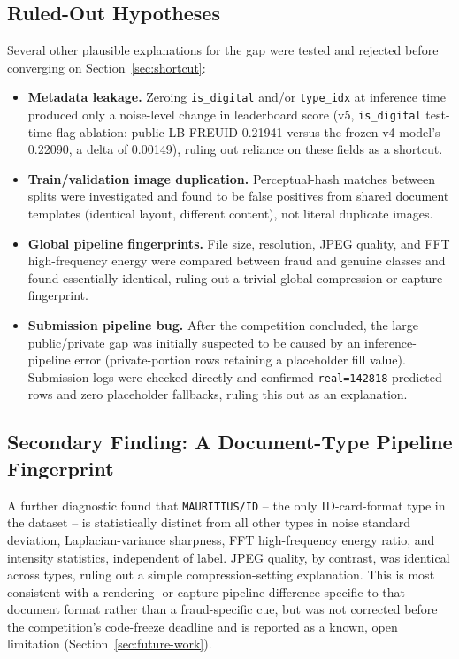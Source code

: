 \documentclass{article}
\begin{document}
\subsection{Ruled-Out Hypotheses}
\label{sec:ruled-out}

Several other plausible explanations for the gap were tested and rejected
before converging on Section~\ref{sec:shortcut}:
\begin{itemize}[noitemsep]
    \item \textbf{Metadata leakage.} Zeroing \texttt{is\_digital} and/or
    \texttt{type\_idx} at inference time produced only a noise-level change
    in leaderboard score (v5, \texttt{is\_digital} test-time flag ablation:
    public LB FREUID 0.21941 versus the frozen v4 model's 0.22090, a delta
    of 0.00149), ruling out reliance on these fields as a shortcut.
    \item \textbf{Train/validation image duplication.} Perceptual-hash
    matches between splits were investigated and found to be false
    positives from shared document templates (identical layout, different
    content), not literal duplicate images.
    \item \textbf{Global pipeline fingerprints.} File size, resolution,
    JPEG quality, and FFT high-frequency energy were compared between
    fraud and genuine classes and found essentially identical, ruling out
    a trivial global compression or capture fingerprint.
    \item \textbf{Submission pipeline bug.} After the competition
    concluded, the large public/private gap was initially suspected to be
    caused by an inference-pipeline error (private-portion rows retaining a
    placeholder fill value). Submission logs were checked directly and
    confirmed \texttt{real=142818} predicted rows and zero placeholder
    fallbacks, ruling this out as an explanation.
\end{itemize}

\subsection{Secondary Finding: A Document-Type Pipeline Fingerprint}
\label{sec:pipeline-fingerprint}

A further diagnostic found that \texttt{MAURITIUS/ID} -- the only
ID-card-format type in the dataset -- is statistically distinct from all
other types in noise standard deviation, Laplacian-variance sharpness, FFT
high-frequency energy ratio, and intensity statistics, independent of
label. JPEG quality, by contrast, was identical across types, ruling out a
simple compression-setting explanation. This is most consistent with a
rendering- or capture-pipeline difference specific to that document format
rather than a fraud-specific cue, but was not corrected before the
competition's code-freeze deadline and is reported as a known, open
limitation (Section~\ref{sec:future-work}).
\end{document}
